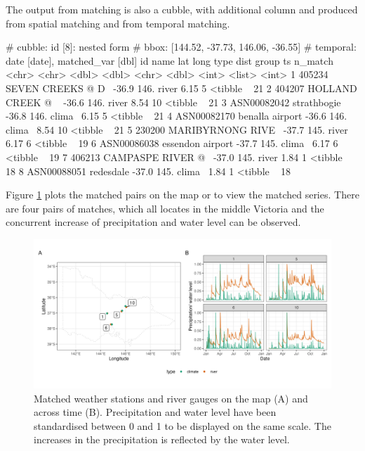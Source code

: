 \documentclass[
]{jss}
\begin{document}
The output from matching is also a cubble, with additional column
 and  produced from spatial matching and
 from temporal matching.

\begin{CodeChunk}
\begin{CodeOutput}
# cubble:   id [8]: nested form
# bbox:     [144.52, -37.73, 146.06, -36.55]
# temporal: date [date], matched_var [dbl]
  id          name                lat  long type    dist group ts        n_match
  <chr>       <chr>             <dbl> <dbl> <chr>  <dbl> <int> <list>      <int>
1 405234      SEVEN CREEKS @ D~ -36.9  146. river   6.15     5 <tibble ~      21
2 404207      HOLLAND CREEK @ ~ -36.6  146. river   8.54    10 <tibble ~      21
3 ASN00082042 strathbogie       -36.8  146. clima~  6.15     5 <tibble ~      21
4 ASN00082170 benalla airport   -36.6  146. clima~  8.54    10 <tibble ~      21
5 230200      MARIBYRNONG RIVE~ -37.7  145. river   6.17     6 <tibble ~      19
6 ASN00086038 essendon airport  -37.7  145. clima~  6.17     6 <tibble ~      19
7 406213      CAMPASPE RIVER @~ -37.0  145. river   1.84     1 <tibble ~      18
8 ASN00088051 redesdale         -37.0  145. clima~  1.84     1 <tibble ~      18
\end{CodeOutput}
\end{CodeChunk}

Figure \ref{fig:matching} plots the matched pairs on the map or to view
the matched series. There are four pairs of matches, which all locates
in the middle Victoria and the concurrent increase of precipitation and
water level can be observed.

\begin{CodeChunk}
\begin{figure}

{\centering \includegraphics[width=1\linewidth]{figures/matching} 

}

\caption[Matched weather stations and river gauges on the map (A) and across time (B)]{Matched weather stations and river gauges on the map (A) and across time (B). Precipitation and water level have been standardised between 0 and 1 to be displayed on the same scale. The increases in the precipitation is reflected by the water level.}\label{fig:matching}
\end{figure}
\end{CodeChunk}
\end{document}
